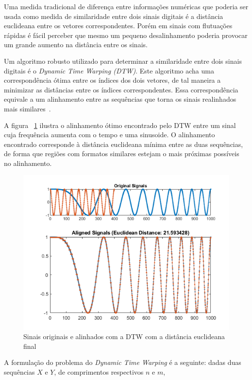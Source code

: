 Uma medida tradicional de diferença entre informações numéricas que poderia ser usada como medida de similaridade entre dois sinais digitais é a distância euclideana entre os vetores correspondentes. Porém em sinais com flutuações rápidas é fácil perceber que mesmo um pequeno desalinhamento poderia provocar um grande aumento na distância entre os sinais.

Um algoritmo robusto utilizado para determinar a similaridade entre dois sinais digitais é o \textit{Dynamic Time Warping (DTW)}. Este algoritmo acha uma correspondência ótima entre os índices dos dois vetores, de tal maneira a minimizar as distâncias entre os índices correspondentes. Essa correspondência equivale a um alinhamento entre as sequências que torna os sinais realinhados mais similares~\citep{shou2005fast}. 

A figura ~\ref{fig:matlab-dtw} ilustra o alinhamento ótimo encontrado pelo DTW entre um sinal cuja frequência aumenta com o tempo e uma sinusoide. O alinhamento encontrado corresponde à distância euclideana mínima entre as duas sequências, de forma que regiões com formatos similares estejam o mais próximas possíveis no alinhamento.

\begin{figure}[htb]
\centering
\includegraphics[width=12cm]{figuras/DynamicTimeWarpingOfRealChirpAndSinusoidExample_01.png}
\caption{Sinais originais e alinhados com a DTW com a distância euclideana final \citep{matlab-dtw}}
\label{fig:matlab-dtw}
\end{figure}

A formulação do problema \citep{salvador2007toward} do \textit{Dynamic Time Warping} é a seguinte: dadas duas sequências $X$ e $Y$, de comprimentos respectivos $n$ e $m$,

